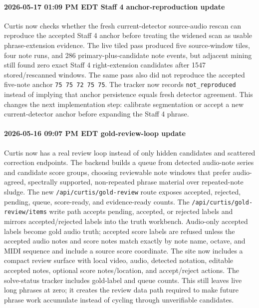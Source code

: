 \paragraph{2026-05-17 01:09 PM EDT Staff 4 anchor-reproduction update} Curtis now checks whether the fresh current-detector source-audio rescan can reproduce the accepted Staff 4 anchor before treating the widened scan as usable phrase-extension evidence. The live tiled pass produced five source-window tiles, four note runs, and 286 primary-plus-candidate note events, but adjacent mining still found zero exact Staff 4 right-extension candidates after 1547 stored/rescanned windows. The same pass also did not reproduce the accepted five-note anchor \texttt{75 75 72 75 75}. The tracker now records \texttt{not\_reproduced} instead of implying that anchor persistence equals fresh detector agreement. This changes the next implementation step: calibrate segmentation or accept a new current-detector anchor before expanding the Staff 4 phrase.

\paragraph{2026-05-16 09:07 PM EDT gold-review-loop update} Curtis now has a real review loop instead of only hidden candidates and scattered correction endpoints. The backend builds a queue from detected audio-note series and candidate score groups, choosing reviewable note windows that prefer audio-agreed, spectrally supported, non-repeated phrase material over repeated-note sludge. The new \texttt{/api/curtis/gold-review} route exposes accepted, rejected, pending, queue, score-ready, and evidence-ready counts. The \texttt{/api/curtis/gold-review/items} write path accepts pending, accepted, or rejected labels and mirrors accepted/rejected labels into the truth workbench. Audio-only accepted labels become gold audio truth; accepted score labels are refused unless the accepted audio notes and score notes match exactly by note name, octave, and MIDI sequence and include a source score coordinate. The site now includes a compact review surface with local video, audio, detected notation, editable accepted notes, optional score notes/location, and accept/reject actions. The solve-status tracker includes gold-label and queue counts. This still leaves live long phrases at zero; it creates the review data path required to make future phrase work accumulate instead of cycling through unverifiable candidates.

